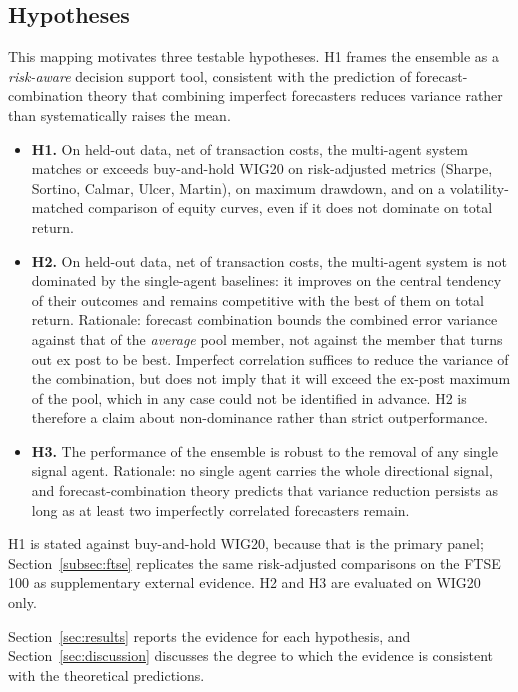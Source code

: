 \documentclass{ieeeaccess}
\begin{document}
\subsection{Hypotheses}

This mapping motivates three testable hypotheses. H1 frames the ensemble as a \emph{risk-aware} decision support tool, consistent with the prediction of forecast-combination theory that combining imperfect forecasters reduces variance rather than systematically raises the mean.

\begin{itemize}
\item \textbf{H1.} On held-out data, net of transaction costs, the multi-agent system matches or exceeds buy-and-hold WIG20 on risk-adjusted metrics (Sharpe, Sortino, Calmar, Ulcer, Martin), on maximum drawdown, and on a volatility-matched comparison of equity curves, even if it does not dominate on total return.
\item \textbf{H2.} On held-out data, net of transaction costs, the multi-agent system is not dominated by the single-agent baselines: it improves on the central tendency of their outcomes and remains competitive with the best of them on total return. Rationale: forecast combination bounds the combined error variance against that of the \emph{average} pool member, not against the member that turns out ex post to be best. Imperfect correlation suffices to reduce the variance of the combination, but does not imply that it will exceed the ex-post maximum of the pool, which in any case could not be identified in advance. H2 is therefore a claim about non-dominance rather than strict outperformance.
\item \textbf{H3.} The performance of the ensemble is robust to the removal of any single signal agent. Rationale: no single agent carries the whole directional signal, and forecast-combination theory predicts that variance reduction persists as long as at least two imperfectly correlated forecasters remain.
\end{itemize}

H1 is stated against buy-and-hold WIG20, because that is the primary panel; Section~\ref{subsec:ftse} replicates the same risk-adjusted comparisons on the FTSE 100 as supplementary external evidence. H2 and H3 are evaluated on WIG20 only.

Section~\ref{sec:results} reports the evidence for each hypothesis, and Section~\ref{sec:discussion} discusses the degree to which the evidence is consistent with the theoretical predictions.
\end{document}
